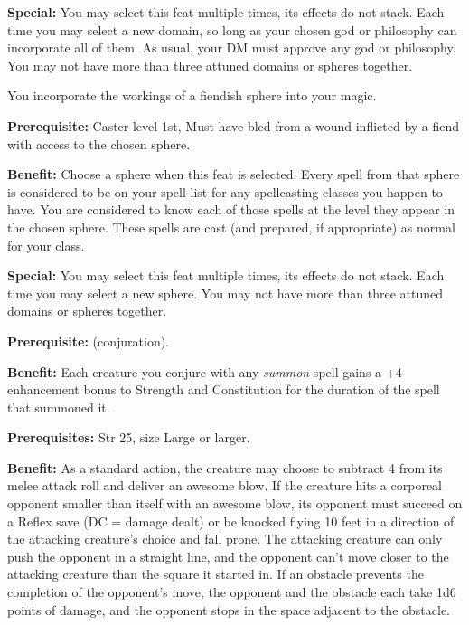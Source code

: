 \textbf{Special:} You may select this feat multiple times, its effects do not stack. Each time you may select a new domain, so long as your chosen god or philosophy can incorporate all of them. As usual, your DM must approve any god or philosophy. You may not have more than three attuned domains or spheres together.


You incorporate the workings of a fiendish sphere into your magic.

\textbf{Prerequisite:} Caster level 1st, Must have bled from a wound inflicted by a fiend with access to the chosen sphere.

\textbf{Benefit:} Choose a sphere when this feat is selected. Every spell from that sphere is considered to be on your spell-list for any spellcasting classes you happen to have. You are considered to know each of those spells at the level they appear in the chosen sphere. These spells are cast (and prepared, if appropriate) as normal for your class.

\textbf{Special:} You may select this feat multiple times, its effects do not stack. Each time you may select a new sphere. You may not have more than three attuned domains or spheres together.


\textbf{Prerequisite:}  (conjuration).

\textbf{Benefit:} Each creature you conjure with any \textit{summon} spell gains a +4 enhancement bonus to Strength and Constitution for the duration of the spell that summoned it.


\textbf{Prerequisites:} Str 25, size Large or larger.

\textbf{Benefit:} As a standard action, the creature may choose to subtract 4 from its melee attack roll and deliver an awesome blow. If the creature hits a corporeal opponent smaller than itself with an awesome blow, its opponent must succeed on a Reflex save (DC = damage dealt) or be knocked flying 10 feet in a direction of the attacking creature's choice and fall prone. The attacking creature can only push the opponent in a straight line, and the opponent can't move closer to the attacking creature than the square it started in. If an obstacle prevents the completion of the opponent's move, the opponent and the obstacle each take 1d6 points of damage, and the opponent stops in the space adjacent to the obstacle.

